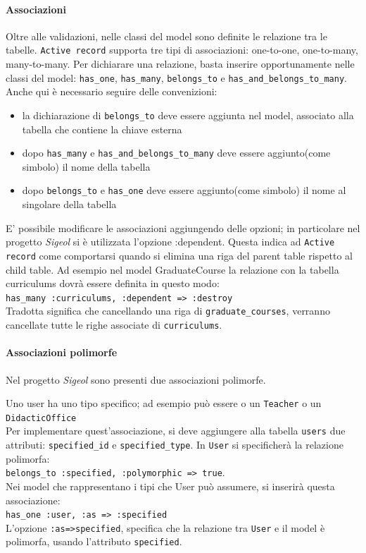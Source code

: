 \documentclass[11pt,a4paper]{article}
\begin{document}
\paragraph{Associazioni}
Oltre alle validazioni, nelle classi del model sono definite le relazione tra le tabelle.
\verb|Active record| supporta tre tipi di associazioni: one-to-one, one-to-many, many-to-many.
Per dichiarare una relazione, basta inserire opportunamente nelle classi del model: \verb|has_one|, \verb|has_many|, \verb|belongs_to| e \verb|has_and_belongs_to_many|.
Anche qui è necessario seguire delle convenizioni:
\begin{itemize}
 \item la dichiarazione di \verb|belongs_to| deve essere aggiunta nel model, associato alla tabella che contiene la chiave esterna
 \item dopo \verb|has_many| e \verb|has_and_belongs_to_many| deve essere aggiunto(come simbolo) il nome della tabella
 \item dopo \verb|belongs_to| e \verb|has_one| deve essere aggiunto(come simbolo) il nome al singolare della tabella
\end{itemize}



E' possibile modificare le associazioni aggiungendo delle opzioni; in particolare nel progetto \textit{Sigeol} si è utilizzata l'opzione :dependent.
Questa indica ad \verb|Active record| come comportarsi quando si elimina una riga del parent table rispetto al child table.
Ad esempio nel model GraduateCourse la relazione con la tabella curriculums dovrà essere definita in questo modo:\\
\verb|has_many :curriculums, :dependent => :destroy|\\
Tradotta significa che cancellando una riga di \verb|graduate_courses|, verranno cancellate tutte le righe associate di \verb|curriculums|.

\paragraph{Associazioni polimorfe}
Nel progetto \textit{Sigeol} sono presenti due associazioni polimorfe.


Uno user ha uno tipo specifico; ad esempio può essere o un \verb|Teacher| o un \verb|DidacticOffice|\\
Per implementare quest'associazione, si deve aggiungere alla tabella \verb|users| due attributi: \verb|specified_id| e \verb|specified_type|.
In \verb|User| si specificherà la relazione polimorfa:\\
\verb|belongs_to :specified, :polymorphic => true|.\\
Nei model che rappresentano i tipi che User può assumere, si inserirà questa associazione:\\
\verb|has_one :user, :as => :specified|\\
L'opzione \verb|:as=>specified|, specifica che la relazione tra \verb|User| e il model è polimorfa, usando l'attributo \verb|specified|.
\end{document}
